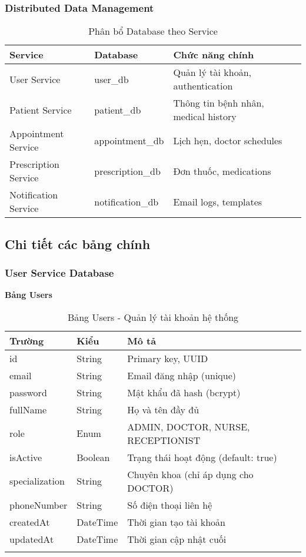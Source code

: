 \documentclass[12pt,a4paper]{report}
\begin{document}
\subsubsection{Distributed Data Management}
\begin{table}[h]
\centering
\caption{Phân bổ Database theo Service}
\begin{tabular}{|l|l|l|}
\hline
\textbf{Service} & \textbf{Database} & \textbf{Chức năng chính} \\
\hline
User Service & user\_db & Quản lý tài khoản, authentication \\
\hline
Patient Service & patient\_db & Thông tin bệnh nhân, medical history \\
\hline
Appointment Service & appointment\_db & Lịch hẹn, doctor schedules \\
\hline
Prescription Service & prescription\_db & Đơn thuốc, medications \\
\hline
Notification Service & notification\_db & Email logs, templates \\
\hline
\end{tabular}
\end{table}

\subsection{Chi tiết các bảng chính}

\subsubsection{User Service Database}
\textbf{Bảng Users}
\begin{longtable}{|p{3cm}|p{2cm}|p{8cm}|}
\hline
\textbf{Trường} & \textbf{Kiểu} & \textbf{Mô tả} \\
\hline
id & String & Primary key, UUID \\
\hline
email & String & Email đăng nhập (unique) \\
\hline
password & String & Mật khẩu đã hash (bcrypt) \\
\hline
fullName & String & Họ và tên đầy đủ \\
\hline
role & Enum & ADMIN, DOCTOR, NURSE, RECEPTIONIST \\
\hline
isActive & Boolean & Trạng thái hoạt động (default: true) \\
\hline
specialization & String & Chuyên khoa (chỉ áp dụng cho DOCTOR) \\
\hline
phoneNumber & String & Số điện thoại liên hệ \\
\hline
createdAt & DateTime & Thời gian tạo tài khoản \\
\hline
updatedAt & DateTime & Thời gian cập nhật cuối \\
\hline
\caption{Bảng Users - Quản lý tài khoản hệ thống}
\end{longtable}
\end{document}
